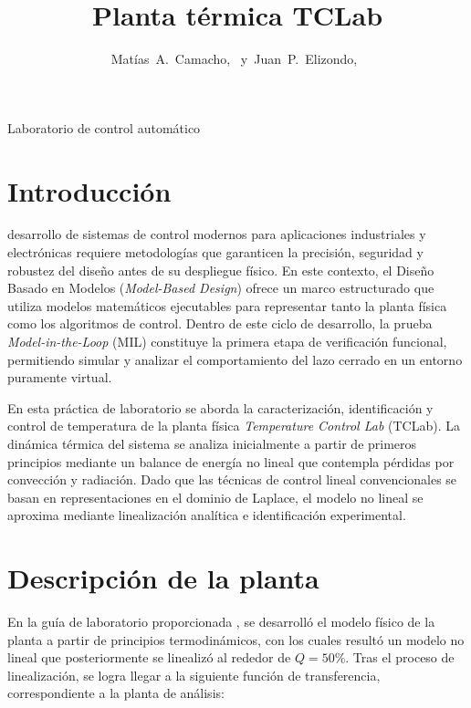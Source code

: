 \documentclass[journal]{IEEEtran}
\begin{document}
\setlength{\parindent}{4.2mm}
\title{Planta térmica TCLab}

\author{Matías~A.~Camacho,~
        y~Juan~P.~Elizondo,~
}

%
{Laboratorio de control automático}


\maketitle


\section{Introducción}

 desarrollo de sistemas de control modernos para aplicaciones industriales y electrónicas 
requiere metodologías que garanticen la precisión, seguridad y robustez del diseño antes de su despliegue 
físico. En este contexto, el Diseño Basado en Modelos (\textit{Model-Based Design}) ofrece un marco estructurado 
que utiliza modelos matemáticos ejecutables para representar tanto la planta física como los algoritmos de 
control. Dentro de este ciclo de desarrollo, la prueba \textit{Model-in-the-Loop} (MIL) constituye la primera etapa de 
verificación funcional, permitiendo simular y analizar el comportamiento del lazo cerrado en un entorno 
puramente virtual.

En esta práctica de laboratorio se aborda la caracterización, identificación y control de temperatura de la planta 
física \textit{Temperature Control Lab} (TCLab). La dinámica térmica del sistema se analiza inicialmente a partir de primeros 
principios mediante un balance de energía no lineal que contempla pérdidas por convección y radiación. Dado que las 
técnicas de control lineal convencionales se basan en representaciones en el dominio de Laplace, el modelo no lineal 
se aproxima mediante linealización analítica e identificación experimental.
\section{Descripción de la planta}
En la guía de laboratorio proporcionada \cite{guia_tclab_2026}, se desarrolló el modelo físico de la planta a partir de principios termodinámicos, 
con los cuales resultó un modelo no lineal que posteriormente se linealizó al rededor de $Q = 50\%$.
Tras el proceso de linealización, se logra llegar a la siguiente función de transferencia, correspondiente a la planta de
análisis:
\end{document}
